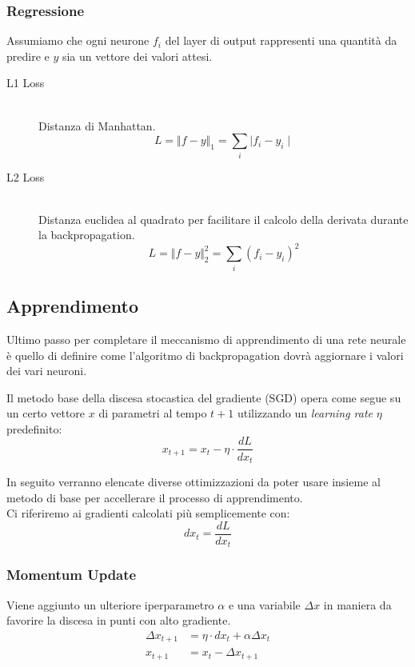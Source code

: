 \subsubsection{Regressione}
Assumiamo che ogni neurone $f_{i}$ del layer di output rappresenti una quantità da predire e $y$ sia un vettore dei valori attesi.

\begin{description}
	\item[L1 Loss]
		\quad\\Distanza di Manhattan.
		$$
		L = \Vert{f-y}\Vert_1 = \sum_{i}{\mid{f_i -y_i \mid}}
		$$
	\item[L2 Loss]
		\quad\\Distanza euclidea al quadrato per facilitare il calcolo della derivata durante la backpropagation.
		$$
		L = \Vert{f -y \Vert_2^2} = \sum_{i}{ (f_i -y_i)^2 }
		$$
\end{description}


\subsection{Apprendimento}

Ultimo passo per completare il meccanismo di apprendimento di una rete neurale è quello di definire come l'algoritmo di backpropagation dovrà aggiornare i valori dei vari neuroni.

Il metodo base della discesa stocastica del gradiente (SGD) opera come segue su un certo vettore $x$ di parametri al tempo $t+1$ utilizzando un \textit{learning rate} $\eta$ predefinito:
$$
x_{t+1} = x_t -\eta{} \cdot \frac{dL}{dx_t}
$$

In seguito verranno elencate diverse ottimizzazioni da poter usare insieme al metodo di base per accellerare il processo di apprendimento.\\
Ci riferiremo ai gradienti calcolati più semplicemente con:
$$dx_t = \frac{dL}{dx_t}$$

\subsubsection{Momentum Update}\cite{Momentum}
Viene aggiunto un ulteriore iperparametro $\alpha$ e una variabile $\Delta{x}$ in maniera da favorire la discesa in punti con alto gradiente.
\begin{align*}
	\Delta x_{t+1} &= \eta \cdot dx_t + \alpha \Delta x_t \\
	x_{t+1} &= x_t - \Delta x_{t+1}
\end{align*}

